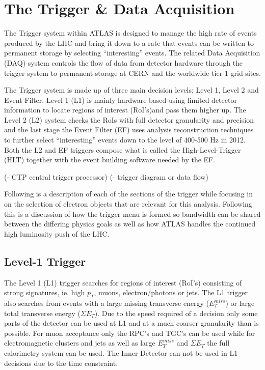 \chapter{The Trigger \& Data Acquisition}

	The Trigger system within ATLAS is designed to manage the high rate of events produced by the LHC and bring it down to a rate that events can be written to permanent storage by selecting ``interesting'' events. The related Data Acquisition (DAQ) system controls the flow of data from detector hardware through the trigger system to permanent storage at CERN and the worldwide tier 1 grid sites. 

	The Trigger system is made up of three main decision levels; Level 1, Level 2 and Event Filter. Level 1 (L1) is mainly hardware based using limited detector information to locate regions of interest (RoI's)and pass them higher up. The Level 2 (L2) system checks the RoIs with full detector granularity and precision and the last stage the Event Filter (EF) uses analysis reconstruction techniques to further select ``interesting'' events down to the level of 400-500 Hz in 2012. Both the L2 and EF triggers compose what is called the High-Level-Trigger (HLT) together with the event building software needed by the EF.

	(- CTP central trigger processor)
	(- trigger diagram or data flow)

	Following is a description of each of the sections of the trigger while focusing in on the selection of electron objects that are relevant for this analysis. Following this is a discussion of how the trigger menu is formed so bandwidth can be shared between the differing physics goals as well as how ATLAS handles the continued high luminosity push of the LHC.


\section{Level-1 Trigger}

	The Level 1 (L1) trigger searches for regions of interest (RoI's) consisting of strong signatures, ie. high $p_{T}$, muons, electron/photons or jets. The L1 trigger also searches from events with a large missing transverse energy ($E^{miss}_{T}$) or large total transverse energy ($\Sigma E_{T}$). Due to the speed required of a decision only some parts of the detector can be used at L1 and at a much coarser granularity than is possible. For muon acceptance only the RPC's and TGC's can be used while for electromagnetic clusters and jets as well as large $E^{miss}_{T}$ and $\Sigma E_{T}$ the full calorimetry system can be used. The Inner Detector can not be used in L1 decisions due to the time constraint.


